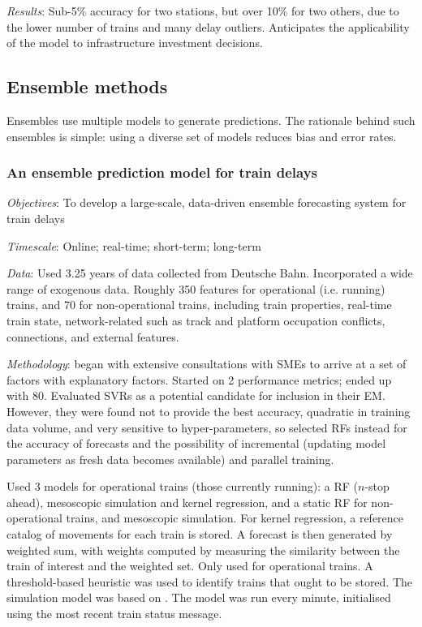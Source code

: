 \documentclass{article}
\begin{document}
\smallskip

\textit{Results}: Sub-5\% accuracy for two stations, but over 10\% for two others, due to the lower number of trains and many delay outliers. Anticipates the applicability of the model to infrastructure investment decisions.

\subsection{Ensemble methods}

Ensembles use multiple models to generate predictions. The rationale behind such ensembles is simple: using a diverse set of models reduces bias and error rates.

\subsubsection{An ensemble prediction model for train delays \cite{nair_et_al_2019}}

\textit{Objectives}: To develop a large-scale, data-driven ensemble forecasting system for train delays

\smallskip

\textit{Timescale}: Online; real-time; short-term; long-term

\smallskip

\textit{Data}: Used 3.25 years of data collected from Deutsche Bahn. Incorporated a wide range of exogenous data. Roughly 350 features for operational (i.e. running) trains, and 70 for non-operational trains, including train properties, real-time train state, network-related such as track and platform occupation conflicts, connections, and external features. 

\smallskip

\textit{Methodology}: began with extensive consultations with SMEs to arrive at a set of factors with explanatory factors. Started on 2 performance metrics; ended up with 80. Evaluated SVRs as a potential candidate for inclusion in their EM. However, they were found not to provide the best accuracy, quadratic in training data volume, and very sensitive to hyper-parameters, so selected RFs instead for the accuracy of forecasts and the possibility of incremental (updating model parameters as fresh data becomes available) and parallel training. 

Used 3 models for operational trains (those currently running): a RF ($n$-stop ahead), mesoscopic simulation and kernel regression, and a static RF for non-operational trains, and mesoscopic simulation. For kernel regression, a reference catalog of movements for each train is stored. A forecast is then generated by weighted sum, with weights computed by measuring the similarity between the train of interest and the weighted set. Only used for operational trains. A threshold-based heuristic was used to identify trains that ought to be stored. The simulation model was based on \cite{szabo_et_al_2017}. The model was run every minute, initialised using the most recent train status message. 
\end{document}

